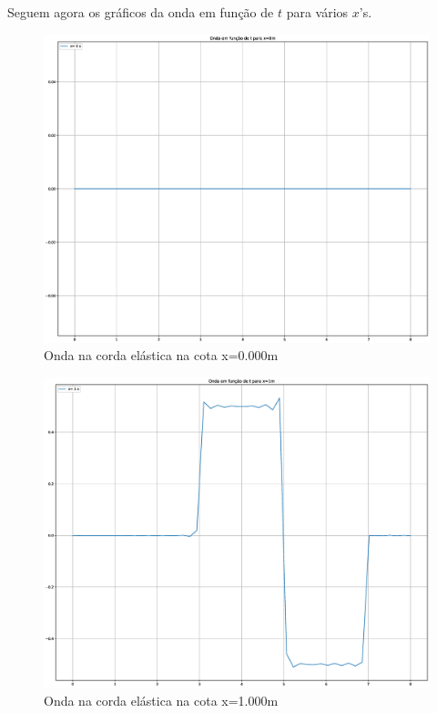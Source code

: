 \documentclass[12pt, a4paper, portuguese]{fphw}
\begin{document}
Seguem agora os gráficos da onda em função de $ t $ para vários $ x $'s.

\begin{figure}[H]
	\centering
	\includegraphics[width=.8\linewidth]{"graficos/grafico_x=0.000m"}
	\caption{Onda na corda elástica na cota x=0.000m}
	\label{fig:grafico-x0}
\end{figure}

\begin{figure}[H]
	\centering
	\includegraphics[width=.8\linewidth]{"graficos/grafico_x=1.000m"}
	\caption{Onda na corda elástica na cota x=1.000m}
	\label{fig:grafico-x1}
\end{figure}
\end{document}

